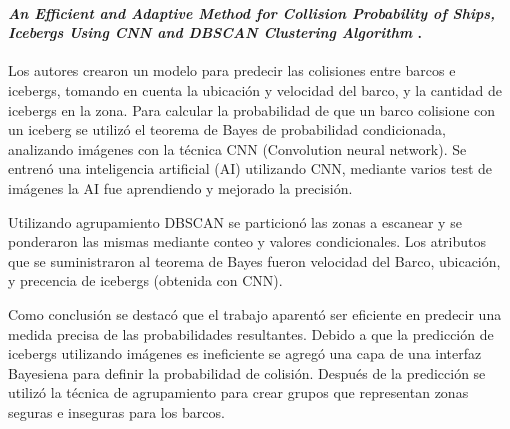 \paragraph{
    \textbf{\emph{An Efficient and Adaptive Method for Collision
    Probability of Ships, Icebergs Using CNN
    and DBSCAN Clustering Algorithm}
    }
    \cite[pág. 20]{somani_emerging_2019}.
}

Los autores crearon un modelo para predecir las colisiones entre barcos e icebergs, 
tomando en cuenta la ubicación y velocidad del barco, y la cantidad de icebergs en la zona.
Para calcular la probabilidad de que un barco colisione con un iceberg 
se utilizó el teorema de Bayes de probabilidad condicionada, analizando imágenes con la técnica CNN (Convolution neural network).
Se entrenó una inteligencia artificial (AI) utilizando CNN, mediante varios test de imágenes la AI fue aprendiendo 
y mejorado la precisión.

Utilizando agrupamiento DBSCAN se particionó las zonas a escanear y se ponderaron
las mismas mediante conteo y valores condicionales. Los atributos que se suministraron al teorema de Bayes fueron 
velocidad del Barco, ubicación, y precencia de icebergs (obtenida con CNN). 
 
Como conclusión se destacó que el trabajo aparentó ser eficiente en predecir
una medida precisa de  las probabilidades resultantes.
Debido a que la predicción de icebergs utilizando imágenes es ineficiente se agregó una capa de una interfaz Bayesiena
para definir la probabilidad de colisión. Después de la predicción se utilizó 
la técnica de agrupamiento para crear grupos que representan zonas seguras e inseguras para los barcos.
